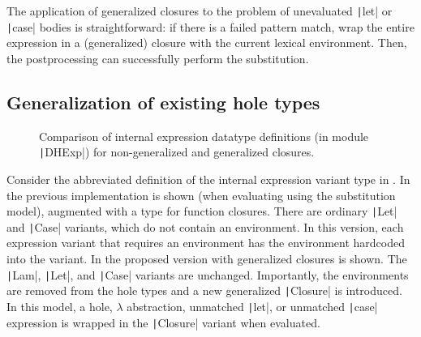 The application of generalized closures to the problem of unevaluated \texttt|let| or \texttt|case| bodies is straightforward: if there is a failed pattern match, wrap the entire expression in a (generalized) closure with the current lexical environment. Then, the postprocessing can successfully perform the substitution.

\subsection{Generalization of existing hole types}
\label{sec:generalized-closures-datatypes}

\begin{figure}
  \centering
  \begin{singlespace}
  \end{singlespace}
  \caption{Comparison of internal expression datatype definitions (in module \texttt|DHExp|) for non-generalized and generalized closures.}
  \label{fig:generalized-closures-datatypes}
\end{figure}

Consider the abbreviated definition of the internal expression variant type in . In  the previous implementation is shown (when evaluating using the substitution model), augmented with a type for function closures. There are ordinary \texttt|Let| and \texttt|Case| variants, which do not contain an environment. In this version, each expression variant that requires an environment has the environment hardcoded into the variant. In  the proposed version with generalized closures is shown. The \texttt|Lam|, \texttt|Let|, and \texttt|Case| variants are unchanged. Importantly, the environments are removed from the hole types and a new generalized \texttt|Closure| is introduced. In this model, a hole, $\lambda$ abstraction, unmatched \texttt|let|, or unmatched \texttt|case| expression is wrapped in the \texttt|Closure| variant when evaluated.

